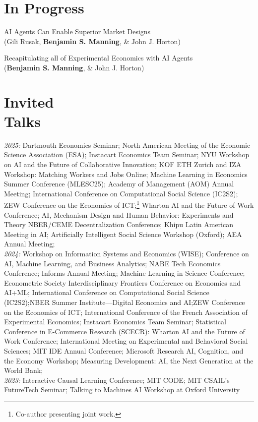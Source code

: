 \documentclass[margin,line,pifont,palatino,courier, 9pt]{res}
\begin{document}
\begin{resume}
\section{\sc In Progress}

AI Agents Can Enable Superior Market Designs\\
(Gili Rusak\footnotemark[\value{footnote}], \textbf{Benjamin S. Manning}\footnotemark[\value{footnote}], \& John J. Horton)

Recapitulating all of Experimental Economics with AI Agents\\
(\textbf{Benjamin S. Manning}\footnotemark[\value{footnote}], \& John J. Horton\footnotemark[\value{footnote}])

\section{\sc Invited\\Talks\footnotemark}
\textit{2025:} 
Dartmouth Economics Seminar;
North American Meeting of the Economic Science Association (ESA);
Instacart Economics Team Seminar;
NYU Workshop on AI and the Future of Collaborative Innovation;
KOF ETH Zurich and IZA Workshop: Matching Workers and Jobs Online;
Machine Learning in Economics Summer Conference (MLESC25);
Academy of Management (AOM) Annual Meeting;
International Conference on Computational Social Science (IC2S2);
ZEW Conference on the Economics of ICT;\footnote{Co-author presenting joint work.}
Wharton AI and the Future of Work Conference;
AI, Mechanism Design and Human Behavior: Experiments and Theory NBER/CEME Decentralization Conference;
Khipu Latin American Meeting in AI;
Artificially Intelligent Social Science Workshop (Oxford);
AEA Annual Meeting;\vspace{2mm}\\
\textit{2024:} Workshop on Information Systems and Economics (WISE)\footnotemark[\value{footnote}];
Conference on AI, Machine Learning, and Business Analytics;
NABE Tech Economics Conference; 
Informs Annual Meeting\footnotemark[\value{footnote}];
Machine Learning in Science Conference;
Econometric Society Interdisciplinary Frontiers Conference on Economics and AI+ML; 
International Conference on Computational Social Science (IC2S2);\footnotemark[\value{footnote}]
NBER Summer Institute---Digital Economics and AI;\footnotemark[\value{footnote}]
ZEW Conference on the Economics of ICT;
International Conference of the French Association of Experimental Economics;
Instacart Economics Team Seminar;
Statistical Conference in E-Commerce Research (SCECR):
Wharton AI and the Future of Work Conference; 
International Meeting on Experimental and Behavioral Social Sciences;
MIT IDE Annual Conference; 
Microsoft Research AI, Cognition, and the Economy Workshop; 
Measuring Development: AI, the Next Generation at the World Bank; 
\vspace{2mm}\\
\textit{2023:} Interactive Causal Learning Conference; 
MIT CODE; 
MIT CSAIL's FutureTech Seminar;
Talking to Machines AI Workshop at Oxford University


\end{resume}
\end{document}
